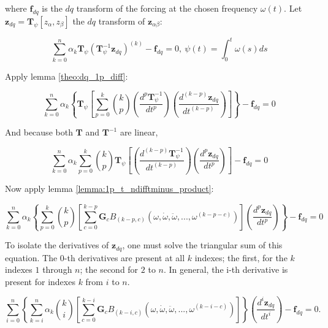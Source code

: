 	\noindent where $\mathbf{f}_{dq}$ is the $dq$ transform of the forcing at the chosen frequency $\omega(t)$. Let $\mathbf{z}_{dq} = \mathbf{T}_\psi \left[z_\alpha,z_\beta\right]$ the $dq$ transform of $\mathbf{z}_{\alpha\beta}$:

\begin{equation} \sum\limits_{k=0}^n \alpha_k \mathbf{T}_\psi\left(\mathbf{T}_\psi^{-1}\mathbf{z}_{dq}\right)^{\left(k\right)} - \mathbf{f}_{dq} = 0,\  \psi(t) = \int_0^t \omega(s)ds \end{equation}

	Apply lemma \ref{theo:dq_1p_diff}:

\begin{equation} \sum\limits_{k=0}^n \alpha_k\left\{\mathbf{T}_\psi\left[ \sum\limits_{p=0}^{k} {k\choose p} \left(\dfrac{d^{p} \mathbf{T}^{-1}_\psi}{dt^p}\right) \left(\dfrac{d^{\left(k-p\right)} \mathbf{z}_{dq}}{dt^{\left(k-p\right)}}\right) \right]\right\} - \mathbf{f}_{dq} = 0 \end{equation}

	And because both $\mathbf{T}$ and $\mathbf{T}^{-1}$ are linear,

\begin{equation} \sum\limits_{k=0}^n \alpha_k \sum\limits_{p=0}^{k} {k\choose p} \mathbf{T}_\psi\left[\left(\dfrac{d^{\left(k-p\right)} \mathbf{T}^{-1}_\psi}{dt^{\left(k-p\right)}}\right) \left(\dfrac{d^p \mathbf{z}_{dq}}{dt^p}\right) \right] - \mathbf{f}_{dq} = 0 \end{equation}

	Now apply lemma \ref{lemma:1p_t_ndifftminus_product}:

\begin{equation} \sum\limits_{k=0}^n \alpha_k \left\{\sum\limits_{p=0}^{k} {k\choose p} \left[\sum\limits_{c=0}^{k-p} \mathbf{G}_c B_{\left(k-p,c\right)}\left(\omega,\dot{\omega},\ddot{\omega},...,\omega^{(k-p-c)}\right) \right] \left(\dfrac{d^p \mathbf{z}_{dq}}{dt^p }\right)\right\} - \mathbf{f}_{dq} = 0 \end{equation}

	To isolate the derivatives of $\mathbf{z}_{dq}$, one must solve the triangular sum of this equation. The 0-th derivatives are present at all $k$ indexes; the first, for the $k$ indexes $1$ through $n$; the second for $2$ to $n$. In general, the i-th derivative is present for indexes $k$ from $i$ to $n$.

\begin{equation} \sum\limits_{i=0}^n \left\{\sum\limits_{k=i}^{n} \alpha_k{k\choose i} \left[\sum\limits_{c=0}^{k-i} \mathbf{G}_c B_{\left(k-i,c\right)}\left(\omega,\dot{\omega},\ddot{\omega},...,\omega^{(k-i-c)}\right) \right]\right\} \left(\dfrac{d^i \mathbf{z}_{dq}}{dt^i }\right) - \mathbf{f}_{dq} = 0 .\end{equation}


